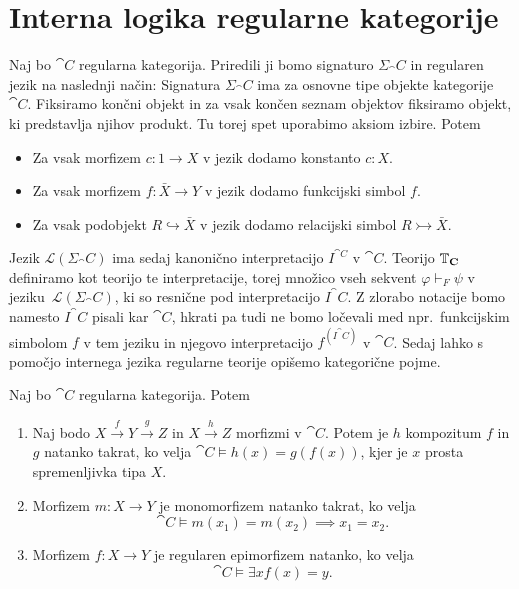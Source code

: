 \documentclass[../kategoricna_logika.tex]{subfiles}
\begin{document}
\section{Interna logika regularne kategorije}
Naj bo $\cat{C}$ regularna kategorija.  Priredili ji bomo signaturo
$\Sigma_\cat{C}$ in regularen jezik na naslednji način: Signatura
$\Sigma_\cat{C}$ ima za osnovne tipe objekte kategorije~$\cat{C}$.
Fiksiramo končni objekt in za vsak končen seznam objektov fiksiramo
objekt, ki predstavlja njihov produkt.  Tu torej spet uporabimo aksiom
izbire. Potem
\begin{itemize}
\item Za vsak morfizem $c : 1 \to X$ v jezik dodamo konstanto $c:X$.
\item Za vsak morfizem $f : \bar{X} \to Y$ v jezik dodamo funkcijski
  simbol $f$.
\item Za vsak podobjekt $R \hookrightarrow \bar{X}$ v jezik dodamo
  relacijski simbol ${R \rightarrowtail \bar{X}}$.
\end{itemize}
Jezik $\mathcal{L}(\Sigma_\cat{C})$ ima sedaj kanonično interpretacijo
$I^{\cat{C}}$ v $\cat{C}$.  Teorijo $\mathbb{T}_{\operatorname{\mathbf{C}}}$ definiramo kot
teorijo te interpretacije, torej množico vseh sekvent
$\varphi \vdash_F \psi$ v jeziku~$\mathcal{L}(\Sigma_\cat{C})$, ki so
resnične pod interpretacijo $I^\cat{C}$. Z zlorabo notacije bomo
namesto $I^\cat{C}$ pisali kar $\cat{C}$, hkrati pa tudi ne bomo
ločevali med npr.\ funkcijskim simbolom $f$ v tem jeziku in njegovo
interpretacijo $f^{(I^\cat{C})}$ v $\cat{C}$.  Sedaj lahko s pomočjo
internega jezika regularne teorije opišemo kategorične pojme.
\begin{lema}\label{lema:morfizmi-v-interni-logiki}
  Naj bo $\cat{C}$ regularna kategorija. Potem
  \begin{enumerate}[label=(\roman*)]
  \item Naj bodo $X \xrightarrow{f} Y \xrightarrow{g} Z$ in
    $X \xrightarrow{h} Z$ morfizmi v $\cat{C}$.  Potem je $h$
    kompozitum $f$ in $g$ natanko takrat, ko velja
    ${\cat{C} \models h(x) = g(f(x))}$, kjer je $x$ prosta
    spremenljivka tipa $X$.
  \item Morfizem $m : X \to Y$ je monomorfizem natanko takrat, ko
    velja
    \[\cat{C} \models m(x_1) = m(x_2) \implies x_1 = x_2. \]
  \item Morfizem $f : X \to Y$ je regularen epimorfizem natanko, ko
    velja
    \[ \cat{C} \models \exists x f(x) = y. \]
  \end{enumerate}
\end{lema}
\end{document}
